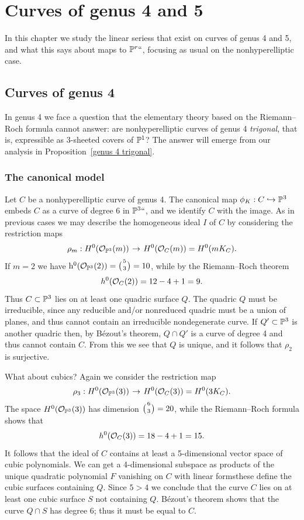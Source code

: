 
\chapter{Curves of genus 4 and 5}\label{genus 4, 5 Chapter}

In this chapter we
study
the linear seriess that exist on curves of genus 4 and 5, and what this says
about maps to ${\mathbb P}^r` `$, focusing as usual on the nonhyperelliptic case.

\section{Curves of genus 4}

In genus 4 we
face
%
a question that the elementary theory based on the Riemann--Roch
formula cannot answer: are nonhyperelliptic curves of genus 4
%
%
\emph{trigonal}, that is, expressible as 3-sheeted covers of ${\mathbb P}^1$?
The answer will emerge from our analysis in
Proposition~\ref{genus 4 trigonal}.

\subsection*{The canonical model}

Let $C$ be a nonhyperelliptic curve of genus 4. The canonical map $\phi_K : C \hookrightarrow {\mathbb P}^3$  embeds $C$ as a curve of degree 6 in ${\mathbb P}^3` `$, and we identify $C$ with the image.  As in previous cases we may describe the homogeneous ideal  $I$ of $C$ by considering the restriction maps
%
$$
\rho_m : H^0(\cO_{\PP^3}(m)) \; \to \; H^0(\cO_{C}(m)) = H^0(mK_C).
$$
If
$m=2$ we have $\h^0(\cO_{\PP^3}(2)) = \tbinom{5}{3} = 10$, while by the
%
Riemann--Roch theorem
$$
h^0({\mathcal O}_C(2)) = 12 - 4 + 1 = 9.
$$
Thus $C \subset {\mathbb P}^3$  lies on at least one quadric surface $Q$. The quadric $Q$ must be irreducible, since any reducible and/or nonreduced quadric must be a union of planes, and thus cannot contain an irreducible nondegenerate curve.
If $Q'\subset\nobreak {\mathbb P}^3$ is another quadric then, by B\'ezout's theorem,
$Q\cap Q'$ is a curve of degree 4 and thus
cannot
contain $C$. From
this we see that $Q$ is unique, and it follows that $\rho_2$ is surjective.

What about cubics? Again we consider the restriction map
$$
\rho_3 : H^0(\cO_{\PP^3}(3)) \; \to \; H^0(\cO_{C}(3)) = H^0(3K_C).
$$
The space $H^0({\mathcal O}_{{\mathbb P}^3}(3))$ has dimension $\tbinom{6}{3} = 20$, while  the Riemann--Roch formula shows that
$$
h^0({\mathcal O}_C(3)) = 18 - 4 + 1 = 15.
$$
It follows that the ideal of $C$ contains at least a 5-dimensional vector space of cubic polynomials. We can get a 4-dimensional subspace as products of the unique quadratic polynomial $F$ vanishing on $C$ with linear forms\emdash these define the cubic surfaces containing $Q$. Since $5 > 4$ we  conclude that the curve $C$ lies on at least one cubic surface $S$  not containing $Q$.
B\'ezout's theorem
%
shows that the curve $Q \cap S$ has degree 6; thus it must be equal to $C$.


